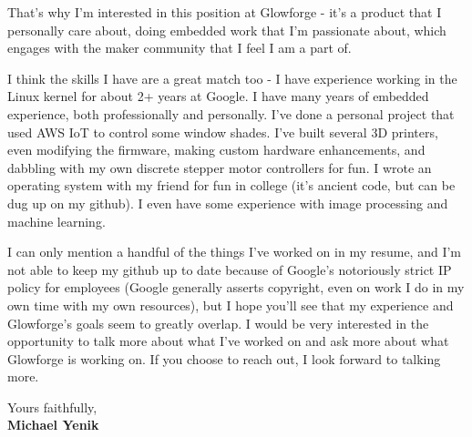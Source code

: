 \documentclass[11pt]{article}
\begin{document}
That's why I'm interested in this position at Glowforge - it's a product that I
personally care about, doing embedded work that I'm passionate about, which
engages with the maker community that I feel I am a part of.

I think the skills I have are a great match too - I have experience working in
the Linux kernel for about 2+ years at Google.  I have many years of embedded
experience, both professionally and personally. I've done a personal project
that used AWS IoT to control some window shades. I've built several 3D printers,
even modifying the firmware, making custom hardware enhancements, and dabbling
with my own discrete stepper motor controllers for fun. I wrote an operating
system with my friend for fun in college (it's ancient code, but can be dug up
on my github). I even have some experience with image processing and machine
learning.

I can only mention a handful of the things I've worked on in my resume, and I'm
not able to keep my github up to date because of Google's notoriously strict IP
policy for employees (Google generally asserts copyright, even on work I do in
my own time with my own resources), but I hope you'll see that my experience and
Glowforge's goals seem to greatly overlap. I would be very interested in the
opportunity to talk more about what I've worked on and ask more about what
Glowforge is working on. If you choose to reach out, I look forward to talking
more.

Yours faithfully,\\[0em] %
%
{\bfseries Michael Yenik}\\
%
\vfill%
\end{document}
